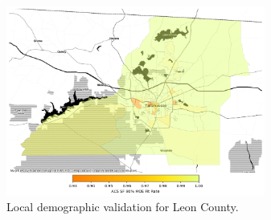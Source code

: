 \begin{figure}[htbp]
\centering
\includegraphics[width=85mm]{figures/local_demographic_validation.png}
\caption{Local demographic validation for Leon County.}
\label{fig:local-demographic-validation}
\end{figure}
